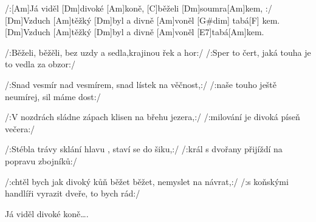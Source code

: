 
/:[Am]Já viděl [Dm]divoké [Am]koně, [C]běželi [Dm]soumra[Am]kem, :/
[Dm]Vzduch [Am]těžký [Dm]byl a divně [Am]voněl [G#dim] tabá[F] kem.
[Dm]Vzduch [Am]těžký [Dm]byl a divně [Am]voněl [E7]tabá[Am]kem.

/:Běželi, běžěli, bez uzdy a sedla,krajinou řek a hor:/
/:Sper to čert, jaká touha je to vedla za obzor:/

/:Snad vesmír nad vesmírem, snad lístek na věčnost,:/
/:naše touho ještě neumírej, sil máme dost:/

/:V nozdrách sládne zápach klisen na břehu jezera,:/
/:milování je divoká píseň večera:/

/:Stébla trávy sklání hlavu , staví se do šiku,:/
/:král s dvořany přijíždí na popravu zbojníků:/

/:chtěl bych jak divoký kůň běžet běžet, nemyslet na návrat,:/
/:s koňskými handlíři vyrazit dveře, to bych rád:/

Já viděl divoké koně….
\slpc